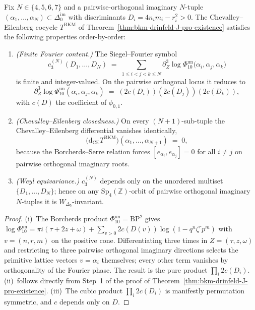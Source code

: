 \begin{proposition}
\label{prop:bkm-drinfeld-J-height-N}
Fix $N\in\{4,5,6,7\}$ and a pairwise-orthogonal imaginary $N$-tuple
$(\alpha_1,\dots,\alpha_N)\subset\Delta^{\mathrm{im}}_0$ with
discriminants $D_i=4n_im_i-r_i^2>0$. The Chevalley--Eilenberg cocycle
$T^{\mathrm{BKM}}$ of Theorem~\ref{thm:bkm-drinfeld-J-pro-existence}
satisfies the following properties order-by-order:
\begin{enumerate}[label=\textup{(\roman*)}]
\item \emph{(Finite Fourier content.)} The Siegel--Fourier symbol
\[
 c_3^{(N)}(D_1,\dots,D_N)
 \;=\; \sum_{1\le i<j<k\le N}
 \partial^3_Z\log\Phi_{10}^{\mathrm{un}}\bigl(\alpha_i,\alpha_j,\alpha_k\bigr)
\]
is finite and integer-valued. On the pairwise orthogonal locus it
reduces to
\[
 \partial^3_Z\log\Phi_{10}^{\mathrm{un}}(\alpha_i,\alpha_j,\alpha_k)
 \;=\; (2c(D_i))(2c(D_j))(2c(D_k)),
\]
with $c(D)$ the coefficient of $\phi_{0,1}$.
\item \emph{(Chevalley--Eilenberg closedness.)}
On every $(N{+}1)$-sub-tuple the Chevalley--Eilenberg differential
vanishes identically,
\[
 \bigl(\mathrm d_{\mathrm{CE}}T^{\mathrm{BKM}}\bigr)(\alpha_1,\dots,\alpha_{N+1})
 \;=\; 0,
\]
because the Borcherds--Serre relation forces
$[e_{\alpha_i},e_{\alpha_j}]=0$ for all $i\ne j$ on pairwise
orthogonal imaginary roots.
\item \emph{(Weyl equivariance.)} $c_3^{(N)}$ depends only on the
unordered multiset $\{D_1,\dots,D_N\}$; hence on any
$\mathrm{Sp}_4(\mathbb Z)$-orbit of pairwise orthogonal imaginary
$N$-tuples it is $W_{\Delta_5}$-invariant.
\end{enumerate}
\end{proposition}

\begin{proof}
(i)~The Borcherds product \(\Phi_{10}^{\mathrm{un}}=\mathrm{BP}^2\) gives
\(\log\Phi_{10}^{\mathrm{un}}=\pi i(\tau+2z+\omega)+\sum_{v>0}2c(D(v))\log(1-q^{n}\zeta^{r}p^{m})\)
with $v=(n,r,m)$ on the positive cone. Differentiating three times in
$Z=(\tau,z,\omega)$ and restricting to three pairwise orthogonal
imaginary directions selects the primitive lattice vectors $v=\alpha_i$
themselves; every other term vanishes by orthogonality of the Fourier
phase. The result is the pure product $\prod_i 2c(D_i)$.
(ii)~follows directly from Step~1 of the proof of
Theorem~\ref{thm:bkm-drinfeld-J-pro-existence}.
(iii)~The cubic product $\prod_i 2c(D_i)$ is manifestly permutation
symmetric, and $c$ depends only on $D$.
\end{proof}

